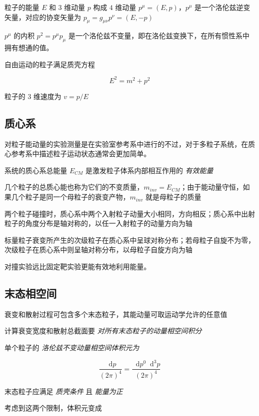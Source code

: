 \documentclass[oneside,a4paper,openany,11pt]{ctexbook}
\newcommand*{\dif}{\mathop{}\!\mathrm{d}} %
\begin{document}
粒子的能量 $E$ 和 $3$ 维动量 $p$ 构成 $4$ 维动量 $p^\mu=(E,p)$，$p^\mu$ 是一个洛伦兹逆变矢量，对应的协变矢量为 $p_\mu=g_{\mu\nu} p^\nu=(E,-p)$

$p^\mu$ 的内积 $p^2=p^\mu p_\mu$ 是一个洛伦兹不变量，即在洛伦兹变换下，在所有惯性系中拥有想通的值。

自由运动的粒子满足质壳方程

\begin{equation}
    E^2 = m^2 + p^2
\end{equation}

粒子的 $3$ 维速度为 $v=p/E$

\subsection{质心系}

对粒子能动量的实验测量是在实验室参考系中进行的不过，对于多粒子系统，在质心参考系中描述粒子运动状态通常会更加简单。

系统的质心系总能量 $E_{CM}$ 是激发粒子体系内部相互作用的 \emph{有效能量}

几个粒子的总质心能也称为它们的不变质量，$m_{inv}=E_{CM}$；由于能动量守恒，如果几个粒子是同一个母粒子的衰变产物，$m_{inv}$ 就是母粒子的质量

两个粒子碰撞时，质心系中两个入射粒子动量大小相同，方向相反；质心系中出射粒子的角度分布是轴对称的，以任一入射粒子的动量方向为轴

标量粒子衰变所产生的次级粒子在质心系中呈球对称分布；若母粒子自旋不为零，次级粒子在质心系中则呈轴对称分布，以母粒子自旋方向为轴

对撞实验远比固定靶实验更能有效地利用能量。

\subsection{末态相空间}

衰变和散射过程可包含多个末态粒子，其能动量可取运动学允许的任意值

计算衰变宽度和散射总截面要 \emph{对所有末态粒子的动量相空间积分}

单个粒子的 \emph{洛伦兹不变动量相空间体积元为}

\begin{equation}
    \frac{\dif p}{(2\pi)^4} = \frac{\dif p^0 \dif^3 p}{(2\pi)^4}
\end{equation}

末态粒子应满足 \emph{质壳条件} 且 \emph{能量为正}

考虑到这两个限制，体积元变成
\end{document}
